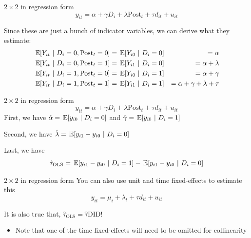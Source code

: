 \documentclass[aspectratio=169,t,11pt,table]{beamer}
\begin{document}
\begin{frame}{$2 \times 2$ in regression form}
  \vspace*{-\bigskipamount}
  $$
    y_{it} = \alpha + \gamma D_i + \lambda \text{Post}_t + \tau d_{it} + u_{it}
  $$
  
  \bigskip
  Since these are just a bunch of indicator variables, we can derive what they estimate:
  \begin{align*}
    \expec{Y_{it}}{D_i = 0, \text{Post}_t = 0} 
    &= \expec{Y_{i0}}{D_i = 0} 
    &= \alpha \\

    \expec{Y_{it}}{D_i = 0, \text{Post}_t = 1} 
    &= \expec{Y_{i1}}{D_i = 0} 
    &= \alpha + \lambda \\

    \expec{Y_{it}}{D_i = 1, \text{Post}_t = 0} 
    &= \expec{Y_{i0}}{D_i = 1} 
    &= \alpha + \gamma \\

    \expec{Y_{it}}{D_i = 1, \text{Post}_t = 1} 
    &= \expec{Y_{i1}}{D_i = 1} 
    &= \alpha + \gamma + \lambda + \tau \\
  \end{align*}
\end{frame}


\begin{frame}{$2 \times 2$ in regression form}
  \vspace*{-\bigskipamount}
  $$
    y_{it} = \alpha + \gamma D_i + \lambda \text{Post}_t + \tau d_{it} + u_{it}
  $$
  \bigskip
  First, we have $\hat{\alpha} = \expec{y_{i0}}{D_i = 0}$ and $\hat{\gamma} = \expec{y_{i0}}{D_i = 1}$

  \bigskip
  Second, we have $\hat{\lambda} = \expec{y_{i1} - y_{i0}}{D_i = 0}$ 

  \bigskip
  Last, we have 
  $$
    \hat{\tau}_{\text{OLS}} = \expec{y_{i1} - y_{i0}}{D_i = 1} - \expec{y_{i1} - y_{i0}}{D_i = 0}
  $$
\end{frame}

\begin{frame}{$2 \times 2$ in regression form}
  You can also use unit and time fixed-effects to estimate this
  $$
    y_{it} = \mu_i + \lambda_t + \tau d_{it} + u_{it}
  $$
  
  \bigskip
  It is also true that, $\hat{\tau}_{\text{OLS}} = \hat{\tau}{\text{DID}}$!
  \begin{itemize}
    \item Note that one of the time fixed-effects will need to be omitted for collinearity
  \end{itemize}
\end{frame}
\end{document}
